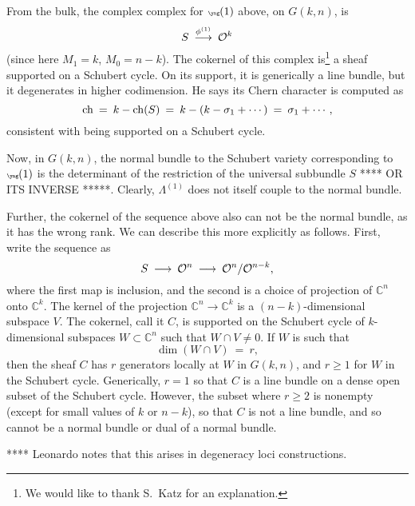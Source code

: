 \documentclass[12pt]{article}
\begin{document}
From the bulk, the complex complex for $\tiny\yng(1)$ above, on $G(k,n)$, is
\begin{equation}
S \: \stackrel{\phi^{(1)}}{\longrightarrow} \: {\cal O}^{k}
\end{equation}
(since here $M_1 = k$, $M_0 = n-k$).
The cokernel of this complex is\footnote{
We would like to thank S.~Katz for an explanation.
}
a sheaf supported on a Schubert cycle.
On its support, it is generically a line bundle, but it degenerates in
higher codimension.  He says its Chern character is computed as
\begin{equation}
{\rm ch} \: = \: k - {\rm ch}(S) \: = \: k - (k -  \sigma_1 + \cdots)
\: = \: \sigma_1 + \cdots,
\end{equation}
consistent with being supported on a Schubert cycle.

Now, in $G(k,n)$, the normal bundle to the Schubert variety corresponding to
$\tiny\yng(1)$ is the determinant of the restriction of the universal
subbundle $S$ **** OR ITS INVERSE *****.
Clearly, $\Lambda^{(1)}$ does not itself couple to the normal bundle.

Further, the cokernel of the sequence above also 
can not be the normal
bundle, as it has the wrong rank. 
We can describe this more explicitly as follows.
First, write the sequence as
\begin{equation}
S \: \longrightarrow \: {\cal O}^n \: \longrightarrow \: {\cal O}^{n}/{\cal O}^{n-k},
\end{equation}
where the first map is inclusion, and the second is a choice of projection
of ${\mathbb C}^n$ onto ${\mathbb C}^k$.  The kernel of the projection
${\mathbb C}^n \rightarrow {\mathbb C}^k$ is a $(n-k)$-dimensional subspace
$V$.  The cokernel, call it $C$, is supported on the Schubert cycle of
$k$-dimensional subspaces $W \subset {\mathbb C}^n$ such that
$W \cap V \neq 0$.  If $W$ is such that 
\begin{equation}
\dim(W \cap V) \: = \: r,
\end{equation}
then the sheaf $C$ has $r$ generators locally at $W$ in $G(k,n)$,
and $r \geq 1$ for $W$ in the Schubert cycle.  Generically, $r=1$ so that
$C$ is a line bundle on a dense open subset of the Schubert cycle.
However,
the subset where $r \geq 2$ is nonempty (except for small values of $k$ or
$n-k$), so that $C$ is not a line bundle, and so cannot be a normal
bundle or dual of a normal bundle.

**** Leonardo notes that this arises in degeneracy loci constructions.
\end{document}
